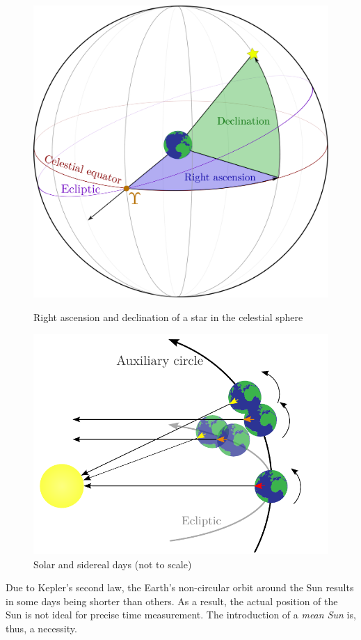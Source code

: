\documentclass[../main.tex]{subfiles}
\begin{document}
\begin{figure}[htbp]
  \centering
  \begin{minipage}[ht]{0.48\textwidth}
    \centering
    \includegraphics[width=\textwidth]{Images/right_ascension-decli.pdf}
    \caption{Right ascension and declination of a star in the celestial sphere}
    \label{fig:right_ascesion}
  \end{minipage}
  \hfill
  \begin{minipage}[ht]{0.48\textwidth}
    \centering
    \includegraphics[width=\textwidth]{Images/siderial.pdf}
    \caption{Solar and sidereal days (not to scale)}
    \label{fig:siderial}
  \end{minipage}
\end{figure}
Due to Kepler's second law, the Earth's non-circular orbit around the Sun results in some days being shorter than others. As a result, the actual position of the Sun is not ideal for precise time measurement. The introduction of a \emph{mean Sun} is, thus, a necessity.
\end{document}
